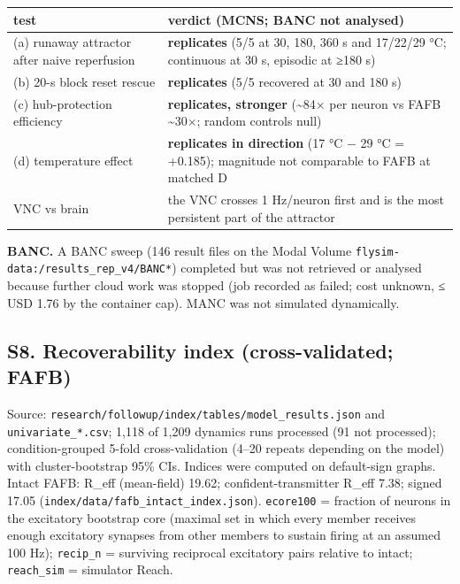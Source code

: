 \documentclass[11pt]{article}
\newcounter{none}
\begin{document}
{\def\LTcaptype{none} %
\begin{longtable}[]{@{}
  >{\raggedright\arraybackslash}p{}
  >{\raggedright\arraybackslash}p{}@{}}
\toprule\noalign{}
\begin{minipage}[b]{\linewidth}\raggedright
test
\end{minipage} & \begin{minipage}[b]{\linewidth}\raggedright
verdict (MCNS; BANC not analysed)
\end{minipage} \\
\midrule\noalign{}
\endhead
\bottomrule\noalign{}
\endlastfoot
(a) runaway attractor after naive reperfusion & \textbf{replicates} (5/5 at 30, 180, 360 s and 17/22/29 °C; continuous at 30 s, episodic at ≥180 s) \\
(b) 20-s block reset rescue & \textbf{replicates} (5/5 recovered at 30 and 180 s) \\
(c) hub-protection efficiency & \textbf{replicates, stronger} (\textasciitilde84× per neuron vs FAFB \textasciitilde30×; random controls null) \\
(d) temperature effect & \textbf{replicates in direction} (17 °C − 29 °C = +0.185); magnitude not comparable to FAFB at matched D \\
VNC vs brain & the VNC crosses 1 Hz/neuron first and is the most persistent part of the attractor \\
\end{longtable}
}

\textbf{BANC.} A BANC sweep (146 result files on the Modal Volume \texttt{flysim-data:/results\_rep\_v4/BANC*}) completed but was not retrieved or analysed because further cloud work was stopped (job recorded as failed; cost unknown, ≤ USD 1.76 by the container cap). MANC was not simulated dynamically.

\subsection{S8. Recoverability index (cross-validated; FAFB)}\label{s8.-recoverability-index-cross-validated-fafb}

Source: \texttt{research/followup/index/tables/model\_results.json} and \texttt{univariate\_*.csv}; 1,118 of 1,209 dynamics runs processed (91 not processed); condition-grouped 5-fold cross-validation (4--20 repeats depending on the model) with cluster-bootstrap 95\% CIs. Indices were computed on default-sign graphs. Intact FAFB: R\_eff (mean-field) 19.62; confident-transmitter R\_eff 7.38; signed 17.05 (\texttt{index/data/fafb\_intact\_index.json}). \texttt{ecore100} = fraction of neurons in the excitatory bootstrap core (maximal set in which every member receives enough excitatory synapses from other members to sustain firing at an assumed 100 Hz); \texttt{recip\_n} = surviving reciprocal excitatory pairs relative to intact; \texttt{reach\_sim} = simulator Reach.
\end{document}
